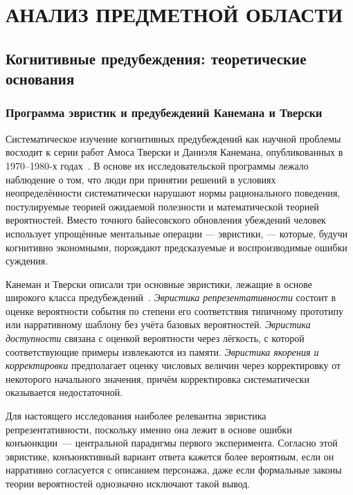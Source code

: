 \chapter{АНАЛИЗ ПРЕДМЕТНОЙ ОБЛАСТИ}

\section{Когнитивные предубеждения: теоретические основания}

\subsection{Программа эвристик и предубеждений Канемана и Тверски}

Систематическое изучение когнитивных предубеждений как научной проблемы восходит к серии работ Амоса Тверски и Даниэля Канемана, опубликованных в 1970--1980-х годах~\cite{tversky1981framing, tversky1983extensional}. В основе их исследовательской программы лежало наблюдение о том, что люди при принятии решений в условиях неопределённости систематически нарушают нормы рационального поведения, постулируемые теорией ожидаемой полезности и математической теорией вероятностей. Вместо точного байесовского обновления убеждений человек использует упрощённые ментальные операции --- эвристики, --- которые, будучи когнитивно экономными, порождают предсказуемые и воспроизводимые ошибки суждения.

Канеман и Тверски описали три основные эвристики, лежащие в основе широкого класса предубеждений~\cite{kahneman2011thinking}. \textit{Эвристика репрезентативности} состоит в оценке вероятности события по степени его соответствия типичному прототипу или нарративному шаблону без учёта базовых вероятностей. \textit{Эвристика доступности} связана с оценкой вероятности через лёгкость, с которой соответствующие примеры извлекаются из памяти. \textit{Эвристика якорения и корректировки} предполагает оценку числовых величин через корректировку от некоторого начального значения, причём корректировка систематически оказывается недостаточной.

Для настоящего исследования наиболее релевантна эвристика репрезентативности, поскольку именно она лежит в основе ошибки конъюнкции~--- центральной парадигмы первого эксперимента. Согласно этой эвристике, конъюнктивный вариант ответа кажется более вероятным, если он нарративно согласуется с описанием персонажа, даже если формальные законы теории вероятностей однозначно исключают такой вывод.

